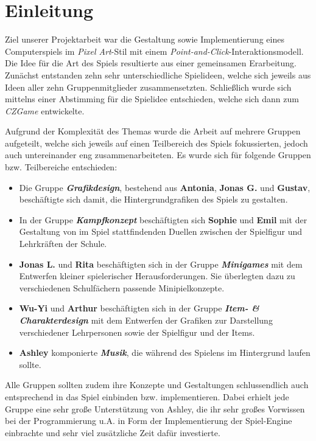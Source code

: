 \chapter{Einleitung}

	Ziel unserer Projektarbeit war die Gestaltung sowie Implementierung eines Computerspiels im \textit{Pixel Art}-Stil mit einem \textit{Point-and-Click}-Interaktionsmodell. \\
    Die Idee für die Art des Spiels resultierte aus einer gemeinsamen Erarbeitung. Zunächst entstanden zehn sehr unterschiedliche Spielideen, welche
    sich jeweils aus Ideen aller zehn Gruppenmitglieder zusammensetzten. Schließlich wurde sich mittelns einer
    Abstimming für die Spielidee entschieden, welche sich dann zum \textit{CZGame} entwickelte.
    
	Aufgrund der Komplexität des Themas wurde die Arbeit auf mehrere Gruppen aufgeteilt, welche sich jeweils
	auf einen Teilbereich des Spiels fokussierten, jedoch auch untereinander eng zusammenarbeiteten.
	Es wurde sich für folgende Gruppen bzw. Teilbereiche entschieden:
	
	\begin{itemize}
		
		\item Die Gruppe \textit{\textbf{Grafikdesign}}, bestehend aus \textbf{Antonia}, \textbf{Jonas G.} und
			\textbf{Gustav}, beschäftigte sich damit, die Hintergrundgrafiken des Spiels zu gestalten.
	
		\item In der Gruppe \textit{\textbf{Kampfkonzept}} beschäftigten sich \textbf{Sophie} und \textbf{Emil}
			mit der Gestaltung von im Spiel stattfindenden Duellen zwischen der Spielfigur und Lehrkräften
			der Schule.
	
		\item \textbf{Jonas L.} und \textbf{Rita} beschäftigten sich in der Gruppe \textit{\textbf{Minigames}} mit dem
			Entwerfen kleiner spielerischer Herausforderungen. Sie überlegten  dazu zu verschiedenen
			Schulfächern passende Minipielkonzepte.
	
		\item \textbf{Wu-Yi} und \textbf{Arthur} beschäftigten sich in der Gruppe \textit{\textbf{Item- \& Charakterdesign}}
			mit dem Entwerfen der Grafiken zur Darstellung verschiedener Lehrpersonen sowie der Spielfigur und der Items.
	
		\item \textbf{Ashley} komponierte \textit{\textbf{Musik}}, die während des Spielens im Hintergrund laufen sollte.
	
	\end{itemize}

	Alle Gruppen sollten zudem ihre Konzepte und Gestaltungen schlussendlich auch entsprechend in das Spiel
	einbinden bzw. implementieren. Dabei erhielt jede Gruppe eine sehr große Unterstützung von Ashley, die
	ihr sehr großes Vorwissen bei der Programmierung u.A. in Form der Implementierung der Spiel-Engine einbrachte
	und sehr viel zusätzliche Zeit dafür investierte.
